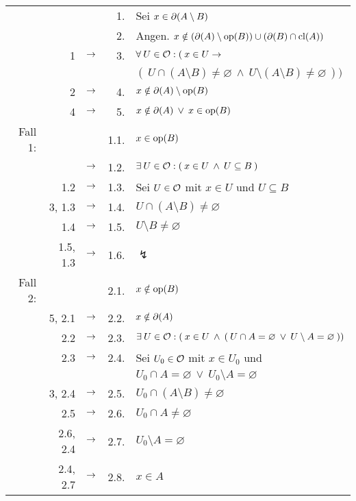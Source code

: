     \begin{longtable}{r r c r l}
        & & & 1. & Sei $x \in \partial(A \setminus B) $ \\
        & & & 2. & Angen. $x \notin (\partial(A) \setminus \text{op}(B)) \cup (\partial(B) \cap \text{cl}(A))$ \\
        & 1 & $\rightarrow$ & 3. & $\forall\: U \in \mathcal{O} : (\: x \in U \to$\\
                           &&&& $(\: U \cap (A \setminus B) \neq \varnothing \:\land\: U \setminus (A \setminus B) \neq \varnothing \:))$ \\
        & 2 & $\rightarrow$ & 4. & $x \notin \partial(A) \setminus \text{op}(B)$ \\
        & 4 & $\rightarrow$ & 5. & $x \notin \partial(A) \:\lor\: x \in \text{op}(B)$ \\
        \hline
        Fall 1: & & & 1.1. & $x \in \text{op}(B)$ \\
        &  & $\rightarrow$ & 1.2. & $\exists\: U \in \mathcal{O} : (\: x \in U \:\land\: U \subseteq B \:)$ \\
        & 1.2 & $\rightarrow$ & 1.3. & Sei $U \in \mathcal{O}$ mit $x \in U$ und $U \subseteq B$  \\
        & 3, 1.3 & $\rightarrow$ & 1.4. & $U \cap (A \setminus B) \neq \varnothing$ \\
        & 1.4 & $\rightarrow$ & 1.5. & $U \setminus B \neq \varnothing$ \\
        & 1.5, 1.3 & $\rightarrow$ & 1.6. & $\lightning$ \\
        \hline
        Fall 2: & & & 2.1. & $x \notin \text{op}(B)$ \\
        & 5, 2.1 & $\rightarrow$ & 2.2. & $x \notin \partial(A)$ \\
        & 2.2 & $\rightarrow$ & 2.3. & $\exists\: U \in \mathcal{O} : (\: x \in U \:\land\: (\: U \cap A = \varnothing \:\lor\: U \setminus A = \varnothing \:))$ \\
        & 2.3 & $\rightarrow$ & 2.4. & Sei $U_0 \in \mathcal{O}$ mit $x \in U_0$ und\\
                               &&&& $U_0 \cap A = \varnothing \:\lor\: U_0 \setminus A = \varnothing$ \\
        & 3, 2.4 & $\rightarrow$ & 2.5. & $U_0 \cap (A \setminus B) \neq \varnothing$ \\
        & 2.5 & $\rightarrow$ & 2.6. & $U_0 \cap A \neq \varnothing$ \\
        & 2.6, 2.4 & $\rightarrow$ & 2.7. & $U_0 \setminus A = \varnothing$ \\
        & 2.4, 2.7 & $\rightarrow$ & 2.8. & $x \in A$ \\

\end{longtable}
